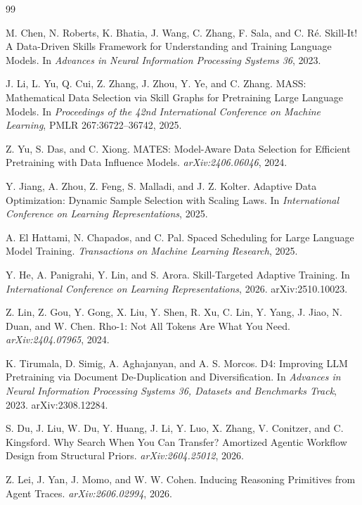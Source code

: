 \begin{thebibliography}{99}

M. Chen, N. Roberts, K. Bhatia, J. Wang, C. Zhang, F. Sala, and C. R\'e. Skill-It! A Data-Driven Skills Framework for Understanding and Training Language Models. In \emph{Advances in Neural Information Processing Systems 36}, 2023.

J. Li, L. Yu, Q. Cui, Z. Zhang, J. Zhou, Y. Ye, and C. Zhang. MASS: Mathematical Data Selection via Skill Graphs for Pretraining Large Language Models. In \emph{Proceedings of the 42nd International Conference on Machine Learning}, PMLR 267:36722--36742, 2025.

Z. Yu, S. Das, and C. Xiong. MATES: Model-Aware Data Selection for Efficient Pretraining with Data Influence Models. \emph{arXiv:2406.06046}, 2024.

Y. Jiang, A. Zhou, Z. Feng, S. Malladi, and J. Z. Kolter. Adaptive Data Optimization: Dynamic Sample Selection with Scaling Laws. In \emph{International Conference on Learning Representations}, 2025.

A. El Hattami, N. Chapados, and C. Pal. Spaced Scheduling for Large Language Model Training. \emph{Transactions on Machine Learning Research}, 2025.

Y. He, A. Panigrahi, Y. Lin, and S. Arora. Skill-Targeted Adaptive Training. In \emph{International Conference on Learning Representations}, 2026. arXiv:2510.10023.

Z. Lin, Z. Gou, Y. Gong, X. Liu, Y. Shen, R. Xu, C. Lin, Y. Yang, J. Jiao, N. Duan, and W. Chen. Rho-1: Not All Tokens Are What You Need. \emph{arXiv:2404.07965}, 2024.

K. Tirumala, D. Simig, A. Aghajanyan, and A. S. Morcos. D4: Improving LLM Pretraining via Document De-Duplication and Diversification. In \emph{Advances in Neural Information Processing Systems 36, Datasets and Benchmarks Track}, 2023. arXiv:2308.12284.

S. Du, J. Liu, W. Du, Y. Huang, J. Li, Y. Luo, X. Zhang, V. Conitzer, and C. Kingsford. Why Search When You Can Transfer? Amortized Agentic Workflow Design from Structural Priors. \emph{arXiv:2604.25012}, 2026.

Z. Lei, J. Yan, J. Momo, and W. W. Cohen. Inducing Reasoning Primitives from Agent Traces. \emph{arXiv:2606.02994}, 2026.


\end{thebibliography}
